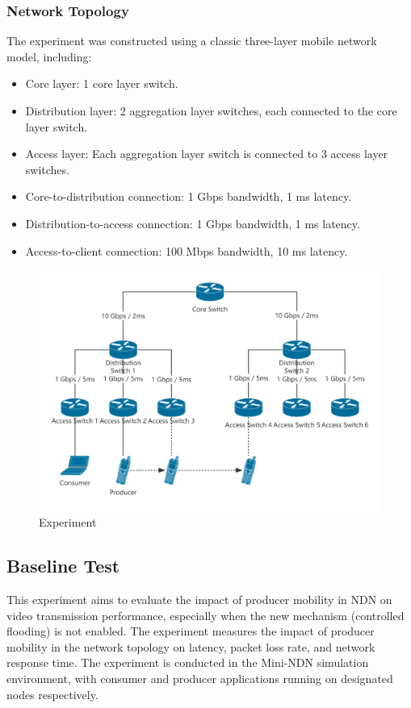\documentclass[conference]{IEEEtran}
\begin{document}
\subsubsection{Network Topology}
The experiment was constructed using a classic three-layer mobile network model, including:
\begin{itemize}
    \item Core layer: 1 core layer switch.
    \item Distribution layer: 2 aggregation layer switches, each connected to the core layer switch.
    \item Access layer: Each aggregation layer switch is connected to 3 access layer switches.
    \item Core-to-distribution connection: 1 Gbps bandwidth, 1 ms latency.
    \item Distribution-to-access connection: 1 Gbps bandwidth, 1 ms latency.
    \item Access-to-client connection: 100 Mbps bandwidth, 10 ms latency.
\end{itemize}

\begin{figure}
    \centering
    \includegraphics[width=\columnwidth]{Topology.png}
    \caption{Experiment}
    \label{fig:enter-label}
\end{figure}

\subsection{Baseline Test}
This experiment aims to evaluate the impact of producer mobility in NDN on video transmission performance, especially when the new mechanism (controlled flooding) is not enabled. The experiment measures the impact of producer mobility in the network topology on latency, packet loss rate, and network response time. The experiment is conducted in the Mini-NDN simulation environment, with consumer and producer applications running on designated nodes respectively.
\end{document}
